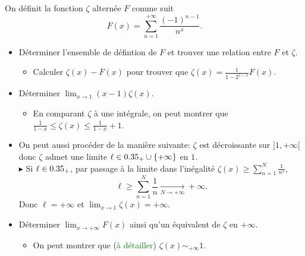 On définit la fonction $\zeta$ alternée $F$ comme suit
$$\boxed{F(x) = \sum_{n=1}^{+ \infty} \frac{(-1)^{n-1}}{n^x}}.$$
\begin{itemize}
    \item Déterminer l'ensemble de défintion de $F$ et trouver une relation entre $F$ et $\zeta$.
    \begin{itemize}
        \item Calculer $\zeta(x) - F(x)$ pour trouver que $\zeta(x) = \frac{1}{1-2^{1-x}} F(x)$.
    \end{itemize}
    \item Déterminer $\displaystyle \lim_{x \to 1} (x-1) \zeta(x)$.
    \begin{itemize}
        \item En comparant $\zeta$ à une intégrale, on peut montrer que $\frac{1}{1-x} \leqslant \zeta(x) \leqslant \frac{1}{1-x} + 1$.
    \end{itemize}
    \item On peut aussi procéder de la manière suivante: $\zeta$ est décroissante sur $]1, +\infty[$ donc $\zeta$ admet une limite $\ell \in 0.35_+ \cup \{ + \infty \}$ en $1$.\\
        $\blacktriangleright$ Si $\ell \in 0.35_+$, par passage à la limite dans l'inégalité $\zeta(x) \geqslant \sum\limits_{n=1}^{N} \frac{1}{n^x}$, $$\ell \geqslant \sum\limits_{n=1}^{N} \frac{1}{n} \xrightarrow[N \to + \infty]{} +\infty.$$ 
        Donc $\ell = + \infty$ et $\displaystyle \lim_{x \to 1} \zeta(x) = +\infty$. 
    \item Déterminer $\displaystyle \lim_{x \to +\infty} F(x)$ ainsi qu'un équivalent de $\zeta$ en $+\infty$.
    \begin{itemize}
        \item On peut montrer que (\textcolor{green}{à détailler}) $\zeta(x) \sim_{+ \infty} 1$.
    \end{itemize}
\end{itemize}